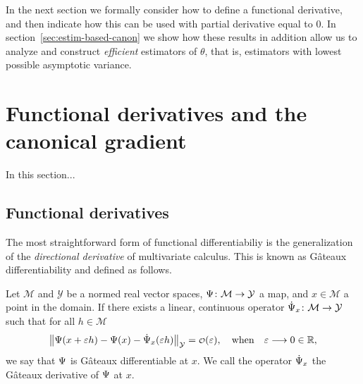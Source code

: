 \documentclass[a4,danish]{article}
\begin{document}
In the next section we formally consider how to define a functional
derivative, and then indicate how this can be used  with
partial derivative equal to 0. In section~\ref{sec:estim-based-canon}
we show how these results in addition allow us to analyze and
construct \textit{efficient} estimators of $\theta$, that is,
estimators with lowest possible asymptotic variance.

\section{Functional derivatives and the canonical gradient}
\label{sec:funct-deriv-can-grad}
In this section...

\subsection{Functional derivatives}
\label{sec:funct-deriv}



The most straightforward form of functional differentiabiliy is the generalization of the
\textit{directional derivative} of multivariate calculus. This is known as Gâteaux differentiability
and defined as follows.

\begin{definition}
  Let $\mathcal{M}$ and $\mathcal{Y}$ be a normed real vector spaces,
  $\operatorname{\Psi} \colon \mathcal{M} \rightarrow \mathcal{Y}$ a map, and $x \in \mathcal{M}$ a point in the
  domain. If there exists a linear, continuous operator
  $\dot{\operatorname{\Psi}}_x \colon \mathcal{M} \rightarrow \mathcal{Y} $ such that for all $h \in \mathcal{M}$
  \begin{equation*}
    \left\Vert
      \TT(x + \epsilon h) - \TT(x) - \dot{\TT}_x(\epsilon h)
    \right\Vert_{\mathcal{Y}} = \smallO(\epsilon),
    \quad \text{when} \quad \epsilon \longrightarrow 0 \in \R,
  \end{equation*}
  we say that $\operatorname{\Psi}$ is Gâteaux differentiable at $x$. We call the operator $\dot{\operatorname{\Psi}}_x$ the
  Gâteaux derivative of $\operatorname{\Psi}$ at $x$.
\end{definition}
\end{document}
